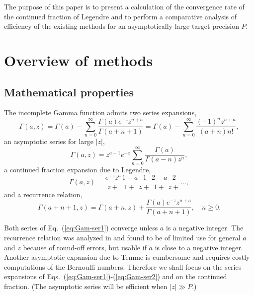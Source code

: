 \documentclass{llncs}
\begin{document}
The purpose of this paper is to present a calculation of the convergence
rate of the continued fraction of Legendre and to perform a comparative
analysis of efficiency of the existing methods for an asymptotically
large target precision $P$.


\section{Overview of methods}


\subsection{Mathematical properties}

The incomplete Gamma function admits two series expansions,\begin{equation}
\Gamma \left(a,z\right)=\Gamma \left(a\right)-\sum _{n=0}^{\infty }\frac{\Gamma \left(a\right)e^{-z}z^{n+a}}{\Gamma \left(a+n+1\right)}=\Gamma \left(a\right)-\sum _{n=0}^{\infty }\frac{\left(-1\right)^{n}z^{n+a}}{\left(a+n\right)n!},\label{eq:Gam-ser1}\end{equation}
 an asymptotic series for large $\left|z\right|$,\begin{equation}
\Gamma \left(a,z\right)=z^{a-1}e^{-z}\sum _{n=0}^{\infty }\frac{\Gamma \left(a\right)}{\Gamma \left(a-n\right)z^{n}},\label{eq:Gam-ser2}\end{equation}
 a continued fraction expansion due to Legendre,\begin{equation}
\Gamma \left(a,z\right)=\frac{e^{-z}z^{a}}{z+}\frac{1-a}{1+}\frac{1}{z+}\frac{2-a}{1+}\frac{2}{z+}...,\end{equation}
 and a recurrence relation,\begin{equation}
\Gamma \left(a+n+1,z\right)=\Gamma \left(a+n,z\right)+\frac{\Gamma \left(a\right)e^{-z}z^{n+a}}{\Gamma \left(a+n+1\right)},\quad n\geq 0.\end{equation}
 

Both series of Eq.~(\ref{eq:Gam-ser1}) converge unless $a$ is a
negative integer. The recurrence relation was analyzed in \cite{Gautschi99}
and found to be of limited use for general $a$ and $z$ because of
round-off errors, but usable if $a$ is close to a negative integer.
Another asymptotic expansion due to Temme \cite{Temme79} is cumbersome
and requires costly computations of the Bernoulli numbers. Therefore
we shall focus on the series expansions of Eqs.~(\ref{eq:Gam-ser1})-(\ref{eq:Gam-ser2})
and on the continued fraction. (The asymptotic series will be efficient
when $\left|z\right|\gg P$.)
\end{document}
